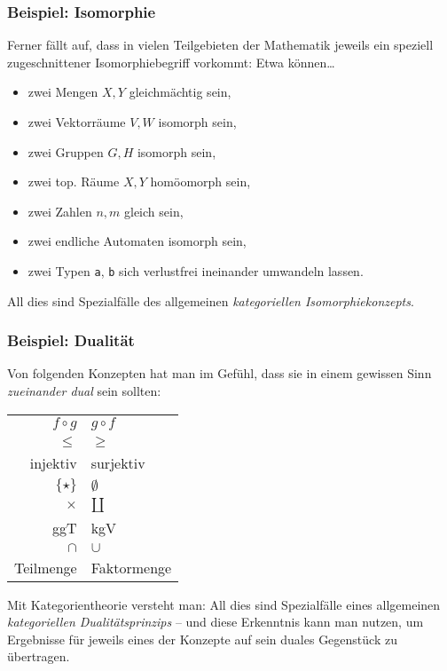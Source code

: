 \subsubsection*{Beispiel: Isomorphie}

Ferner fällt auf, dass in vielen Teilgebieten der Mathematik jeweils ein
speziell zugeschnittener Isomorphiebegriff vorkommt: Etwa können\ldots
\begin{itemize}
  \item zwei Mengen $X,Y$ \tabto{4.63cm} gleichmächtig sein,
  \item zwei Vektorräume $V,W$ \tabto{4.63cm} isomorph sein,
  \item zwei Gruppen $G,H$ \tabto{4.63cm} isomorph sein,
  \item zwei top. Räume $X,Y$ \tabto{4.63cm} homöomorph sein,
  \item zwei Zahlen $n,m$ \tabto{4.63cm} gleich sein,
  \item zwei endliche Automaten isomorph sein,
  \item zwei Typen \texttt{a}, \texttt{b} \tabto{4.63cm} sich verlustfrei ineinander umwandeln lassen.
\end{itemize}
All dies sind Spezialfälle des allgemeinen \emph{kategoriellen
Isomorphiekonzepts}.

\subsubsection*{Beispiel: Dualität}

Von folgenden Konzepten hat man im Gefühl, dass sie in einem gewissen Sinn
\emph{zueinander dual} sein sollten:
\begin{center}
  \setlength{\extrarowheight}{0.3em}
  \begin{tabular}{r|l}
    $f \circ g$ & $g \circ f$ \\
    $\leq$ & $\geq$ \\
    injektiv & surjektiv \\
    $\{\star\}$ & $\emptyset$ \\
    $\times$ & $\amalg$ \\
    ggT & kgV \\
    $\cap$ & $\cup$ \\
    Teilmenge & Faktormenge
  \end{tabular}
\end{center}
Mit Kategorientheorie versteht man: All dies sind Spezialfälle eines allgemeinen
\emph{kategoriellen Dualitätsprinzips} -- und diese Erkenntnis kann man nutzen,
um Ergebnisse für jeweils eines der Konzepte auf sein duales Gegenstück zu
übertragen.

